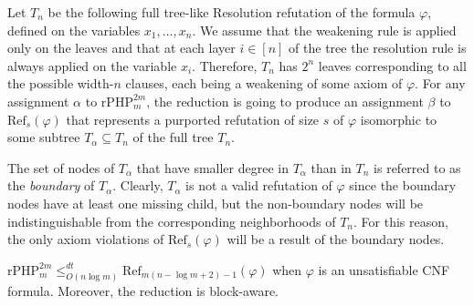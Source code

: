 Let $T_n$ be the following full tree-like Resolution refutation of the formula $\varphi$, defined on the variables $x_1, \ldots, x_n$. We assume that the weakening rule is applied only on the leaves and that at each layer $i \in [n]$ of the tree the resolution rule is always applied on the variable $x_i$. Therefore, $T_n$ has $2^n$ leaves corresponding to all the possible width-$n$ clauses, each being a weakening of some axiom of $\varphi$.
For any assignment $\alpha$ to $\mathrm{rPHP}_m^{2m}$, the reduction is going to produce an assignment $\beta$ to $\mathrm{Ref}_{s}(\varphi)$ that represents a purported refutation of size $s$ of $\varphi$ isomorphic to some subtree $T_\alpha \subseteq T_n$ of the full tree $T_n$.

The set of nodes of $T_\alpha$ that have smaller degree in $T_\alpha$ than in $T_n$ is referred to as the \textit{boundary} of $T_\alpha$. Clearly, $T_\alpha$ is not a valid refutation of $\varphi$ since the boundary nodes have at least one missing child, but the non-boundary nodes will be indistinguishable from the corresponding neighborhoods of $T_n$. For this reason, the only axiom violations of $\mathrm{Ref}_{s}(\varphi)$ will be a result of the boundary nodes.

\addtocounter{theorem}{-5}
\begin{theorem}[restated]
    \label{thm:rPHP_to_Ref}
    $\mathrm{rPHP}^{2m}_{m} \leq^{dt}_{O(n\log m)} \mathrm{Ref}_{m(n-\log m +2)-1}(\varphi)$ when $\varphi$ is an unsatisfiable CNF formula. Moreover, the reduction is block-aware.
\end{theorem}
\addtocounter{theorem}{4}

